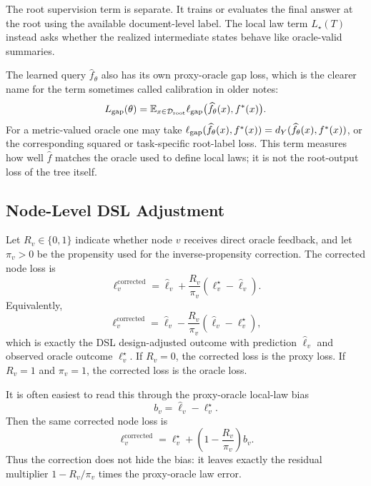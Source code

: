 The root supervision term is separate. It trains or evaluates the final
answer at the root using the available document-level label. The local
law term \(L_\star(T)\) instead asks whether the
realized intermediate states behave like oracle-valid summaries.

The learned query \(\widehat f_\theta\) also has its own proxy-oracle
gap loss, which is the clearer name for the term sometimes called
calibration in older notes:
\[
  L_{\mathrm{gap}}(\theta)
  =
  \mathbb{E}_{x\in\mathcal D_{\mathrm{root}}}
  \ell_{\mathrm{gap}}
  \bigl(\widehat f_\theta(x),f^\ast(x)\bigr).
\]
For a metric-valued oracle one may take
\(\ell_{\mathrm{gap}}(\widehat f_\theta(x),f^\ast(x))
=d_Y(\widehat f_\theta(x),f^\ast(x))\), or the corresponding squared
or task-specific root-label loss. This term measures how well
\(\widehat f\) matches the oracle used to define local laws; it is not
the root-output loss of the tree itself.

\subsection{Node-Level DSL Adjustment}
\label{app:drlaw-node-adjustment}

Let \(R_v\in\{0,1\}\) indicate whether node \(v\) receives direct
oracle feedback, and let \(\pi_v>0\) be the propensity used for the
inverse-propensity correction. The corrected node loss is
\begin{equation}
\label{eq:drlaw-node-adjustment}
  \ell_v^{\mathrm{corrected}}
  =
  \widehat\ell_v
  +
  \frac{R_v}{\pi_v}
  \left(\ell_v^\star-\widehat\ell_v\right).
\end{equation}
Equivalently,
\[
  \ell_v^{\mathrm{corrected}}
  =
  \widehat\ell_v
  -
  \frac{R_v}{\pi_v}
  \left(\widehat\ell_v-\ell_v^\star\right),
\]
which is exactly the DSL design-adjusted outcome with
prediction \(\widehat\ell_v\) and observed oracle outcome
\(\ell_v^\star\). If \(R_v=0\), the corrected loss is the proxy loss.
If \(R_v=1\) and \(\pi_v=1\), the corrected loss is the oracle loss.

It is often easiest to read this through the proxy-oracle local-law
bias
\[
  b_v
  =
  \widehat\ell_v-\ell_v^\star .
\]
Then the same corrected node loss is
\begin{equation}
\label{eq:drlaw-node-bias-form}
  \ell_v^{\mathrm{corrected}}
  =
  \ell_v^\star
  +
  \left(1-\frac{R_v}{\pi_v}\right)b_v .
\end{equation}
Thus the correction does not hide the bias: it leaves exactly the
residual multiplier \(1-R_v/\pi_v\) times the proxy-oracle law error.

